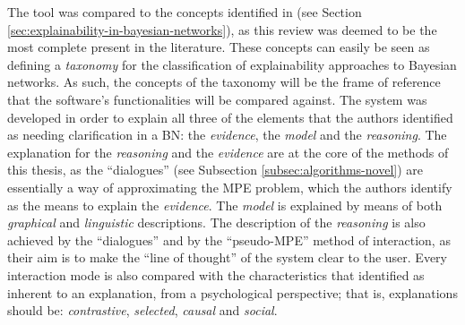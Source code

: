 The tool was compared to the concepts identified in \citet{lacave2002review} (see Section \ref{sec:explainability-in-bayesian-networks}), as this review was deemed to be the most complete present in the literature.
These concepts can easily be seen as defining a \textit{taxonomy} for the classification of explainability approaches to Bayesian networks.
As such, the concepts of the taxonomy will be the frame of reference that the software's functionalities will be compared against.
The system was developed in order to explain all three of the elements that the authors identified as needing clarification in a BN: the \textit{evidence}, the \textit{model} and the \textit{reasoning}.
The explanation for the \textit{reasoning} and the \textit{evidence} are at the core of the methods of this thesis, as the \enquote{dialogues} (see Subsection \ref{subsec:algorithms-novel}) are essentially a way of approximating the MPE problem, which the authors identify as the means to explain the \textit{evidence}.
The \textit{model} is explained by means of both \textit{graphical} and \textit{linguistic} descriptions.
The description of the \textit{reasoning} is also achieved by the \enquote{dialogues} and by the \enquote{pseudo-MPE} method of interaction, as their aim is to make the \enquote{line of thought} of the system clear to the user.
Every interaction mode is also compared with the characteristics that \citet{miller2018explanation} identified as inherent to an explanation, from a psychological perspective; that is, explanations should be: \textit{contrastive}, \textit{selected}, \textit{causal} and \textit{social}.

